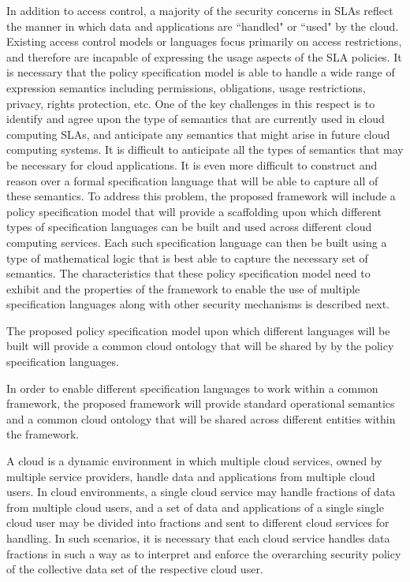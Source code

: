 \documentclass[10pt, conference, compsoc]{IEEEtran}
\begin{document}
In addition to access control, a majority of the security concerns in SLAs reflect the manner in which data and applications are ``handled" or ``used" by the cloud.  Existing access control models or languages focus primarily on access restrictions, and therefore are incapable of expressing the usage aspects of the SLA policies. It is necessary that the policy specification model is able to handle a wide range of expression semantics including permissions, obligations, usage restrictions, privacy, rights protection, etc. One of the key challenges in this respect is to identify and agree upon the type of semantics that are currently used in cloud computing SLAs, and anticipate any semantics that might arise in future cloud computing systems. It is difficult to anticipate all the types of semantics that may be necessary for cloud applications. It is even more difficult to construct and reason over a formal specification language that will be able to capture all of these semantics. To address this problem, the proposed framework will include a policy specification model that will provide a scaffolding  upon which different types of specification languages can be built and used across different cloud computing services. Each such specification language can then be built using a type of mathematical logic that is best able to capture the necessary set of semantics. The characteristics that these policy specification model need to exhibit and the properties of the framework to enable the use of multiple specification languages along with other security mechanisms is described next. 

The proposed policy specification model upon which different languages will be built will provide a common cloud ontology that will be shared by by the policy specification languages.

In order to enable different specification languages to work within a common framework, the proposed framework will provide standard operational semantics and a common cloud ontology that will be shared across different entities within the framework. 

A cloud is a dynamic environment in which multiple cloud services, owned by multiple service providers, handle data and applications from multiple cloud users. In cloud environments, a single cloud service may handle fractions of data from multiple cloud users, and a set of data and applications of a single single cloud user may be divided into fractions and sent to different cloud services for handling. In such scenarios, it is necessary that each cloud service handles data fractions in such a way as to interpret and enforce the overarching security policy of the collective data set of the respective cloud user. 
\end{document}
